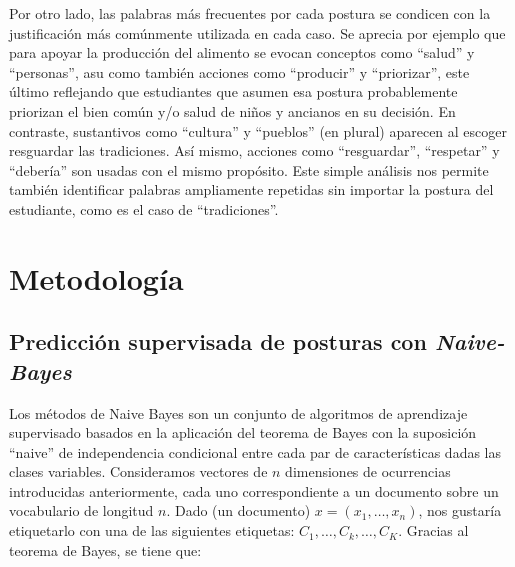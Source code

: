 \documentclass[
	spanish, %
	letterpaper, oneside
]{article}
\begin{document}


\newp Por otro lado, las palabras más frecuentes por cada postura se condicen con la justificación más comúnmente utilizada en cada caso. Se aprecia por ejemplo que para apoyar la producción del alimento se evocan conceptos como ``salud'' y ``personas'', asu como también acciones como ``producir'' y ``priorizar'', este último reflejando que estudiantes que asumen esa postura probablemente priorizan el bien común y/o salud de niños y ancianos en su decisión. En contraste, sustantivos como ``cultura'' y ``pueblos'' (en plural) aparecen al escoger resguardar las tradiciones. Así mismo, acciones como ``resguardar'', ``respetar'' y ``debería'' son usadas con el mismo propósito. Este simple análisis nos permite también identificar palabras ampliamente repetidas sin importar la postura del estudiante, como es el caso de ``tradiciones''.




\section{Metodología}

\subsection{Predicción supervisada de posturas con \textit{Naive-Bayes}}

Los métodos de Naive Bayes son un conjunto de algoritmos de aprendizaje supervisado basados en la aplicación del teorema de Bayes con la suposición ``naive'' de independencia condicional entre cada par de características dadas las clases variables. Consideramos vectores de $n$ dimensiones de ocurrencias introducidas anteriormente, cada uno correspondiente a un documento sobre un vocabulario de longitud $n$. Dado (un documento) $x=(x_1,\dots,x_n)$, nos gustaría etiquetarlo con una de las siguientes etiquetas: $C_1,\dots,C_k,\dots,C_K$. Gracias al teorema de Bayes, se tiene que:
\end{document}
